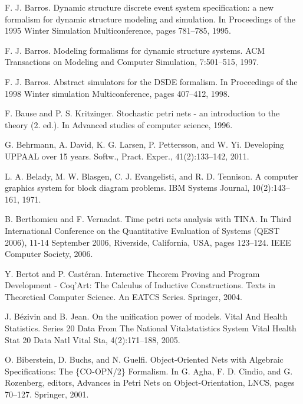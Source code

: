 \begin{description}[style=nextline,leftmargin=12mm,labelwidth=10mm,font=\normalfont]
\item[{[23]}] F. J. Barros. Dynamic structure discrete event system specification: a new formalism for dynamic structure modeling and simulation. In Proceedings of the 1995 Winter Simulation Multiconference, pages 781–785, 1995.

\item[{[24]}] F. J. Barros. Modeling formalisms for dynamic structure systems. ACM Transactions on Modeling and Computer Simulation, 7:501–515, 1997.

\item[{[25]}] F. J. Barros. Abstract simulators for the DSDE formalism. In Proceedings of the 1998 Winter simulation Multiconference, pages 407–412, 1998.

\item[{[26]}] F. Bause and P. S. Kritzinger. Stochastic petri nets - an introduction to the theory (2. ed.). In Advanced studies of computer science, 1996.

\item[{[27]}] G. Behrmann, A. David, K. G. Larsen, P. Pettersson, and W. Yi. Developing UPPAAL over 15 years. Softw., Pract. Exper., 41(2):133–142, 2011.

\item[{[28]}] L. A. Belady, M. W. Blasgen, C. J. Evangelisti, and R. D. Tennison. A computer graphics system for block diagram problems. IBM Systems Journal, 10(2):143–161, 1971.

\item[{[29]}] B. Berthomieu and F. Vernadat. Time petri nets analysis with TINA. In Third International Conference on the Quantitative Evaluation of Systems (QEST 2006), 11-14 September 2006, Riverside, California, USA, pages 123–124. IEEE Computer Society, 2006.

\item[{[30]}] Y. Bertot and P. Castéran. Interactive Theorem Proving and Program Development - Coq’Art: The Calculus of Inductive Constructions. Texts in Theoretical Computer Science. An EATCS Series. Springer, 2004.

\item[{[31]}] J. Bézivin and B. Jean. On the unification power of models. Vital And Health Statistics. Series 20 Data From The National Vitalstatistics System Vital Health Stat 20 Data Natl Vital Sta, 4(2):171–188, 2005.

\item[{[32]}] O. Biberstein, D. Buchs, and N. Guelfi. Object-Oriented Nets with Algebraic Specifications: The \{CO-OPN/2\} Formalism. In G. Agha, F. D. Cindio, and G. Rozenberg, editors, Advances in Petri Nets on Object-Orientation, LNCS, pages 70–127. Springer, 2001.


\end{description}
